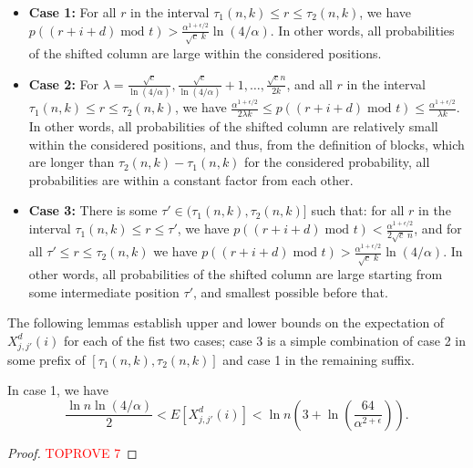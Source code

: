 \documentclass[11pt]{article}
\begin{document}
\begin{itemize}
    \item \textbf{Case 1:} For all $r$ in the interval $\tau_1(n,k) \leq r \leq \tau_2(n,k)$, we have 
$p((r+i+d)\; \text{mod } t) > \frac{\alpha^{1+\epsilon/2} }{\sqrt{c}\; k} \ln({4}/{\alpha})$.
{In other words, all probabilities of the shifted column are large within the considered positions.}
    \item \textbf{Case 2:} For $\lambda = \frac{\sqrt{c}}{\ln({4}/{\alpha})}, 
    \frac{\sqrt{c}}{\ln({4}/{\alpha})}+1 ,\ldots, 
    \frac{\sqrt{c} n}{2 k}$,
     and all $r$ in the interval $\tau_1(n,k) \leq r \leq \tau_2(n,k)$, we have 
  $\frac{\alpha^{1 + \epsilon/2} }{2\lambda k} \le p((r+i+d) \; \text{mod } t) 
  \le \frac{\alpha^{1+ \epsilon/2}  }{ \lambda k}$.
{In other words, all probabilities of the shifted column are relatively small within the considered positions, and thus, from the definition of blocks, which are longer than $\tau_2(n,k)-\tau_1(n,k)$ for the considered probability, all probabilities are within a constant factor from each other.}

    \item \textbf{Case 3:} There is some $\tau'\in (\tau_1(n,k),\tau_2(n,k)]$ such that: for all $r$ in the interval $\tau_1(n,k) \leq r \leq \tau'$, we have 
$p((r+i+d)\; \text{mod } t) < \frac{\alpha^{1+\epsilon/2} }{2\sqrt{c}\; n}$, and for all $\tau' \le r \le \tau_2(n,k)$ we have $p((r+i+d)\; \text{mod } t) > \frac{\alpha^{1+\epsilon/2} }{\sqrt{c}\; k} \ln({4}/{\alpha})$.
{In other words, all probabilities of the shifted column are large starting from some intermediate position $\tau'$, and smallest possible before that.}

\end{itemize}

The following lemmas establish upper and lower bounds on the expectation of $X^d_{j,j'}(i)$ 
{for each of the fist two cases; case 3 is a simple combination of case 2 in some prefix of $[\tau_1(n,k),\tau_2(n,k)]$ and case 1 in the remaining suffix.}

\begin{lemma}\label{case1}
    In case 1, we have
    \[
    \frac{\ln n \ln({4}/{\alpha})}{2} 
    < E[X^d_{j,j'}(i)] <
    \ln n \left( 3 + \ln\left(\frac{64}{\alpha^{2 +\epsilon }}  \right) \right).
    \]
\end{lemma}
\begin{proof}\textcolor{red}{TOPROVE 7}\end{proof}
\end{document}
